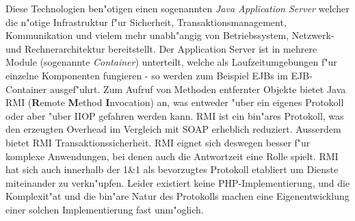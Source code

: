 Diese Technologien ben"otigen einen sogenannten \emph{Java Application Server} welcher die n"otige Infrastruktur
f"ur Sicherheit, Transaktionsmanagement, Kommunikation und vielem mehr unabh"angig von Betriebssystem, Netzwerk- und Rechnerarchitektur
bereitstellt. Der Application Server ist in mehrere Module (sogenannte \emph{Container}) unterteilt, welche als Laufzeitumgebungen f"ur einzelne
Komponenten fungieren - so werden zum Beispiel EJBs im EJB-Container ausgef"uhrt. Zum Aufruf von Methoden entfernter Objekte bietet Java 
RMI (\textbf{R}emote \textbf{M}ethod \textbf{I}nvocation) an, was entweder "uber ein eigenes Protokoll oder aber "uber IIOP gefahren werden kann.
RMI ist ein bin"ares Protokoll, was den erzeugten Overhead im Vergleich mit SOAP erheblich reduziert.
Ausserdem bietet RMI Transaktionssicherheit. RMI eignet sich deswegen besser f"ur 
komplexe Anwendungen, bei denen auch die Antwortzeit eine Rolle spielt. RMI hat sich auch innerhalb der 1\&1 als bevorzugtes Protokoll 
etabliert um Dienste miteinander zu verkn"upfen. Leider existiert keine PHP-Implementierung, und die Komplexit"at und die bin"are Natur des
Protokolls machen eine Eigenentwicklung einer solchen Implementierung fast unm"oglich.


